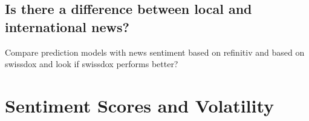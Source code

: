 \subsection{Is there a difference between local and international news?}

Compare prediction models with news sentiment based on refinitiv and based on swissdox and look if swissdox performs better?

\section{Sentiment Scores and Volatility}

\cite{audrino2020}

%
%
%
%
%
%
%
%
%


\cleardoublepage
